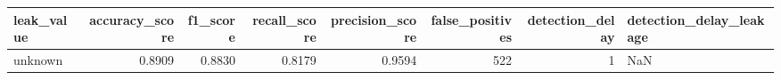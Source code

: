 \begin{tabular}{lrrrrrrl}
\toprule
leak\_value & accuracy\_score & f1\_score & recall\_score & precision\_score & false\_positives & detection\_delay & detection\_delay\_leakage \\
\midrule
unknown & 0.8909 & 0.8830 & 0.8179 & 0.9594 & 522 & 1 & NaN \\
\bottomrule
\end{tabular}
